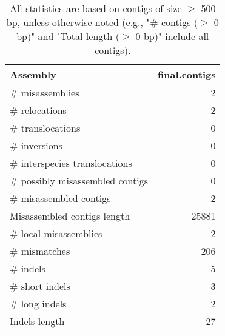 \documentclass[12pt,a4paper]{article}
\begin{document}
\begin{table}[ht]
\begin{center}
\caption{All statistics are based on contigs of size $\geq$ 500 bp, unless otherwise noted (e.g., "\# contigs ($\geq$ 0 bp)" and "Total length ($\geq$ 0 bp)" include all contigs).}
\begin{tabular}{|l*{1}{|r}|}
\hline
Assembly & final.contigs \\ \hline
\# misassemblies & 2 \\ \hline
\hspace{5mm}\# relocations & 2 \\ \hline
\hspace{5mm}\# translocations & 0 \\ \hline
\hspace{5mm}\# inversions & 0 \\ \hline
\hspace{5mm}\# interspecies translocations & 0 \\ \hline
\# possibly misassembled contigs & 0 \\ \hline
\# misassembled contigs & 2 \\ \hline
Misassembled contigs length & 25881 \\ \hline
\# local misassemblies & 2 \\ \hline
\# mismatches & 206 \\ \hline
\# indels & 5 \\ \hline
\hspace{5mm}\# short indels & 3 \\ \hline
\hspace{5mm}\# long indels & 2 \\ \hline
Indels length & 27 \\ \hline
\end{tabular}
\end{center}
\end{table}
\end{document}
